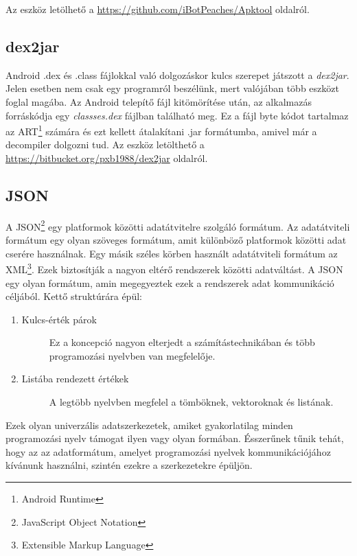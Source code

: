 \documentclass{thesis-ekf}
\theoremstyle{definition}
\theoremstyle{remark}
\begin{document}
Az eszköz letölhető a \url{https://github.com/iBotPeaches/Apktool} oldalról.

\subsection{dex2jar}

Android .dex és .class fájlokkal való dolgozáskor kulcs szerepet játszott a \emph{dex2jar}.
Jelen esetben nem csak egy programról beszélünk, mert valójában több eszközt foglal magába.
Az Android telepítő fájl kitömörítése után, az alkalmazás forráskódja egy \emph{classses.dex} fájlban található meg.
Ez a fájl byte kódot tartalmaz az ART\footnote{Android Runtime} számára és ezt kellett átalakítani .jar formátumba, amivel már a decompiler dolgozni tud.
Az eszköz letölthető a \url{https://bitbucket.org/pxb1988/dex2jar} oldalról.

\subsection{JSON}

A JSON\footnote{JavaScript Object Notation} egy platformok közötti adatátvitelre szolgáló formátum.
Az adatátviteli formátum egy olyan szöveges formátum, amit különböző platformok közötti adat cserére használnak.
Egy másik széles körben használt adatátviteli formátum az XML\footnote{Extensible Markup Language}.
Ezek biztosítják a nagyon eltérő rendszerek közötti adatváltást.
A JSON egy olyan formátum, amin megegyeztek ezek a rendszerek adat kommunikáció céljából. \cite{json1}
Kettő struktúrára épül:

\begin{enumerate}
	\item
	\begin{description}
		\item[Kulcs-érték párok] Ez a koncepció nagyon elterjedt a számítástechnikában és több programozási nyelvben van megfelelője. 
	\end{description}
	\item
	\begin{description}
		\item[Listába rendezett értékek] A legtöbb nyelvben megfelel a tömböknek, vektoroknak és listának.
	\end{description}
\end{enumerate}

Ezek olyan univerzális adatszerkezetek, amiket gyakorlatilag minden programozási nyelv támogat ilyen vagy olyan formában.
Ésszerűnek tűnik tehát, hogy az az adatformátum, amelyet programozási nyelvek kommunikációjához kívánunk használni, szintén ezekre a szerkezetekre épüljön.\cite{json2}
\end{document}

